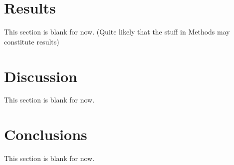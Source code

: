 \documentclass[11pt]{report}
\begin{document}
\section{Results \label{sec:results}}
This section is blank for now. (Quite likely that the stuff in Methods may constitute results)

\section{Discussion \label{sec:discussion}}
This section is blank for now. 

\section{Conclusions \label{sec:conclusions}}
This section is blank for now. 

\small
\renewcommand{\bibsep}{0em}

\renewcommand{\bibname}{References}


\end{document}
